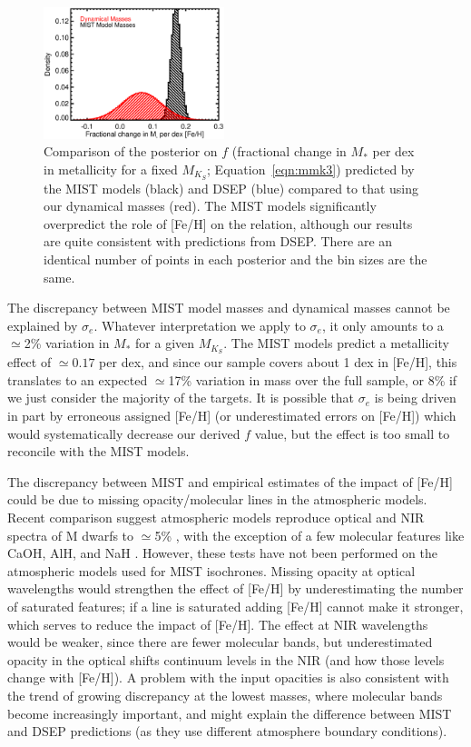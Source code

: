 \documentclass[twocolumn]{aastex62}
\newcommand{\mks}{$M_{K_S}$}
\begin{document}
\begin{figure}[htp]
\begin{center}
\includegraphics[width=0.47\textwidth]{F_plot.eps}
\caption{Comparison of the posterior on $f$ (fractional change in $M_*$ per dex in metallicity for a fixed \mks; Equation~\ref{eqn:mmk3}) predicted by the MIST models (black) and DSEP (blue) compared to that using our dynamical masses (red). The MIST models significantly overpredict the role of [Fe/H] on the relation, although our results are quite consistent with predictions from DSEP. There are an identical number of points in each posterior and the bin sizes are the same. }
\label{fig:f}
\end{center}
\end{figure}

The discrepancy between MIST model masses and dynamical masses cannot be explained by $\sigma_e$. Whatever interpretation we apply to $\sigma_e$, it only amounts to a $\simeq$2\% variation in $M_*$ for a given \mks. The MIST models predict a metallicity effect of $\simeq0.17$ per dex, and since our sample covers about 1 dex in [Fe/H], this translates to an expected $\simeq$17\% variation in mass over the full sample, or 8\% if we just consider the majority of the targets. It is possible that $\sigma_e$ is being driven in part by erroneous assigned [Fe/H] (or underestimated errors on [Fe/H]) which would systematically decrease our derived $f$ value, but the effect is too small to reconcile with the MIST models. 

 The discrepancy between MIST and empirical estimates of the impact of [Fe/H] could be due to missing opacity/molecular lines in the atmospheric models. Recent comparison suggest atmospheric models reproduce optical and NIR spectra of M dwarfs to $\simeq$5\% \citep[e.g.,][]{Lepine:2013,Mann2013c}, with the exception of a few molecular features like CaOH, AlH, and NaH \citep{Rajpurohit:2013}. However, these tests have not been performed on the atmospheric models used for MIST isochrones. Missing opacity at optical wavelengths would strengthen the effect of [Fe/H] by underestimating the number of saturated features; if a line is saturated adding [Fe/H] cannot make it stronger, which serves to reduce the impact of [Fe/H]. The effect at NIR wavelengths would be weaker, since there are fewer molecular bands, but underestimated opacity in the optical shifts continuum levels in the NIR (and how those levels change with [Fe/H]). A problem with the input opacities is also consistent with the trend of growing discrepancy at the lowest masses, where molecular bands become increasingly important, and might explain the difference between MIST and DSEP predictions (as they use different atmosphere boundary conditions). 
 
\end{document}
